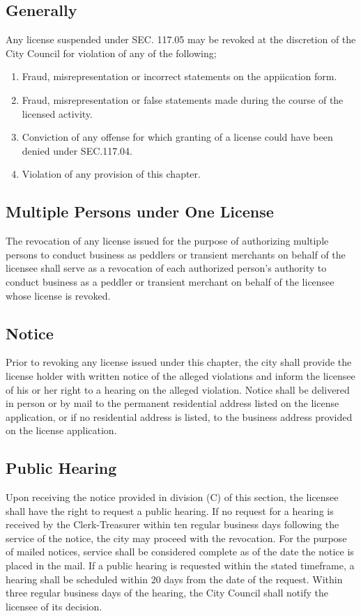 \subsection{Generally}
Any license suspended under SEC. 117.05 may be revoked at the discretion of the City Council for violation of any of the following;
\begin{enumerate}[{\indent}1)]
    \item Fraud, misrepresentation or incorrect statements on the appiication form.
    \item Fraud, misrepresentation or false statements made during the course of the licensed activity.
    \item Conviction of any offense for which granting of a license could have been denied under SEC.117.04.
    \item Violation of any provision of this chapter.
\end{enumerate}
\subsection{Multiple Persons under One License}
The revocation of any license issued for the purpose of authorizing multiple persons to conduct business as peddlers or transient merchants on behalf of the licensee shall serve as a revocation of each authorized person’s authority to conduct business as a peddler or transient merchant on behalf of the licensee whose license is revoked.
\subsection{Notice}
Prior to revoking any license issued under this chapter, the city shall provide the license holder with written notice of the alleged violations and inform the licensee of his or her right to a hearing on the alleged violation. Notice shall be delivered in person or by mail to the permanent residential address listed on the license application, or if no residential address is listed, to the business address provided on the license application.
\subsection{Public Hearing}
Upon receiving the notice provided in division (C) of this section, the licensee shall have the right to request a public hearing. If no request for a hearing is received by the Clerk-Treasurer within ten regular business days following the service of the notice, the city may proceed with the revocation. For the purpose of mailed notices, service shall be considered complete as of the date the notice is placed in the mail. If a public hearing is requested within the stated timeframe, a hearing shall be scheduled within 20 days from the date of the request. Within three regular business days of the hearing, the City Council shall notify the licensee of its decision.
